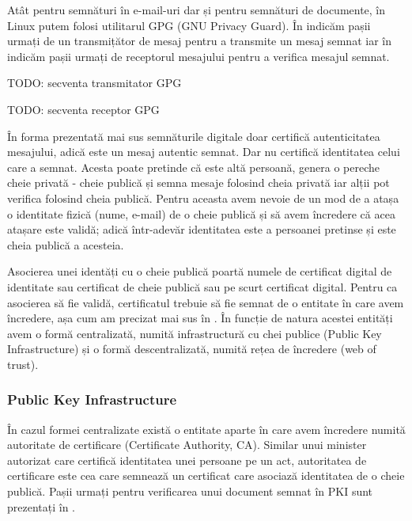 Atât pentru semnături în e-mail-uri dar și pentru semnături de documente, în Linux putem folosi utilitarul GPG (GNU Privacy Guard). În  indicăm pașii urmați de un transmițător de mesaj pentru a transmite un mesaj semnat iar în  indicăm pașii urmați de receptorul mesajului pentru a verifica mesajul semnat.

\begin{screen}[caption={Semnare mesaj folosind GPG},label={lst:sec:gpg-sign}]
TODO: secventa transmitator GPG
\end{screen}

\begin{screen}[caption={Verificare mesaj folosind GPG},label={lst:sec:gpg-verify}]
TODO: secventa receptor GPG
\end{screen}

În forma prezentată mai sus semnăturile digitale doar certifică autenticitatea mesajului, adică este un mesaj autentic semnat. Dar nu certifică identitatea celui care a semnat. Acesta poate pretinde că este altă persoană, genera o pereche cheie privată - cheie publică și semna mesaje folosind cheia privată iar alții pot verifica folosind cheia publică. Pentru aceasta avem nevoie de un mod de a atașa o identitate fizică (nume, e-mail) de o cheie publică și să avem încredere că acea atașare este validă; adică într-adevăr identitatea este a persoanei pretinse și este cheia publică a acesteia.

Asocierea unei identăți cu o cheie publică poartă numele de certificat digital de identitate sau certificat de cheie publică sau pe scurt certificat digital. Pentru ca asocierea să fie validă, certificatul trebuie să fie semnat de o entitate în care avem încredere, așa cum am precizat mai sus în . În funcție de natura acestei entități avem o formă centralizată, numită infrastructură cu chei publice (Public Key Infrastructure) și o formă descentralizată, numită rețea de încredere (web of trust).

\subsubsection{Public Key Infrastructure}
\label{sec:sec:pki}

În cazul formei centralizate există o entitate aparte în care avem încredere numită autoritate de certificare (Certificate Authority, CA). Similar unui minister autorizat care certifică identitatea unei persoane pe un act, autoritatea de certificare este cea care semnează un certificat care asociază identitatea de o cheie publică. Pașii urmați pentru verificarea unui document semnat în PKI sunt prezentați în .

